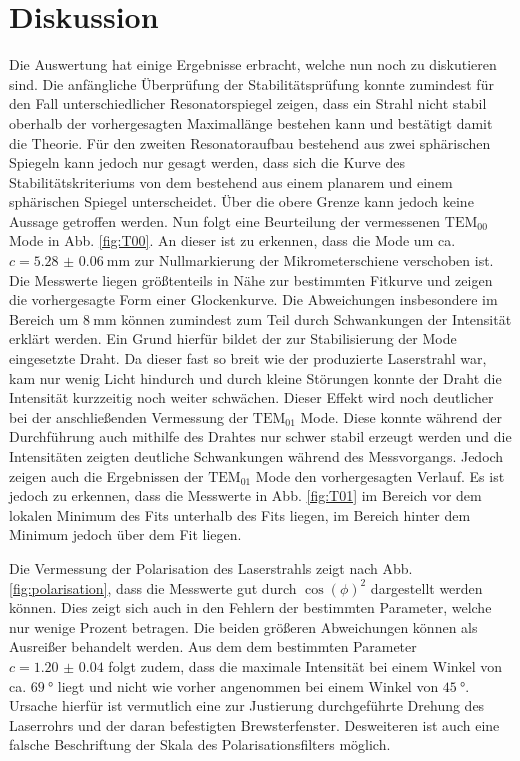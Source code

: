 
\section{Diskussion}
\label{sec:Diskussion}
Die Auswertung hat einige Ergebnisse erbracht, welche nun noch zu diskutieren sind. Die anfängliche Überprüfung der Stabilitätsprüfung konnte zumindest für den Fall unterschiedlicher Resonatorspiegel zeigen, dass ein Strahl nicht stabil oberhalb der vorhergesagten Maximallänge bestehen kann und bestätigt damit die Theorie. Für den zweiten Resonatoraufbau bestehend aus zwei sphärischen Spiegeln kann jedoch nur gesagt werden, dass sich die Kurve des Stabilitätskriteriums von dem bestehend aus einem planarem und einem sphärischen Spiegel unterscheidet. Über die obere Grenze kann jedoch keine Aussage getroffen werden. %
 Nun folgt eine Beurteilung der vermessenen $\text{TEM}_\text{00}$ Mode in Abb. \ref{fig:T00}. An dieser ist zu erkennen, dass die Mode um ca. $c = \SI{5.28(6)}{\milli\meter}$ zur Nullmarkierung der Mikrometerschiene verschoben ist. Die Messwerte liegen größtenteils in Nähe zur bestimmten Fitkurve und zeigen die vorhergesagte Form einer Glockenkurve. Die Abweichungen insbesondere im Bereich um $\SI{8}{\milli\meter}$ können zumindest zum Teil durch Schwankungen der Intensität erklärt werden. Ein Grund hierfür bildet der zur Stabilisierung der Mode eingesetzte Draht. Da dieser fast so breit wie der produzierte Laserstrahl war, kam nur wenig Licht hindurch und durch kleine Störungen konnte der Draht die Intensität kurzzeitig noch weiter schwächen. Dieser Effekt wird noch deutlicher bei der anschließenden Vermessung der $\text{TEM}_{01}$ Mode. Diese konnte während der Durchführung auch mithilfe des Drahtes nur schwer stabil erzeugt werden und die Intensitäten zeigten deutliche Schwankungen während des Messvorgangs. Jedoch zeigen auch die Ergebnissen der $\text{TEM}_{01}$ Mode den vorhergesagten Verlauf. Es ist jedoch zu erkennen, dass die Messwerte in Abb. \ref{fig:T01} im Bereich vor dem lokalen Minimum des Fits unterhalb des Fits liegen, im Bereich hinter dem Minimum jedoch über dem Fit liegen. 


Die Vermessung der Polarisation des Laserstrahls zeigt nach Abb. \ref{fig:polarisation}, dass die Messwerte gut durch $\cos(\phi)^2$ dargestellt werden können. Dies zeigt sich auch in den Fehlern der bestimmten Parameter, welche nur wenige Prozent betragen. Die beiden größeren Abweichungen können als Ausreißer behandelt werden. Aus dem dem bestimmten Parameter $c = \num{1.20(4)}$ folgt zudem, dass die maximale Intensität bei einem Winkel von ca. $\SI{69}{\degree}$ liegt und nicht wie vorher angenommen bei einem Winkel von $\SI{45}{\degree}$. Ursache hierfür ist vermutlich eine zur Justierung durchgeführte Drehung des Laserrohrs und der daran befestigten Brewsterfenster. Desweiteren ist auch eine falsche Beschriftung der Skala des Polarisationsfilters möglich.
